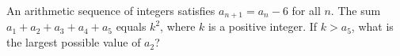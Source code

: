 An arithmetic sequence of integers satisfies $a_{n+1}=a_n-6$ for all $n$. The sum $a_1+a_2+a_3+a_4+a_5$ equals $k^2$, where $k$ is a positive integer. If $k>a_5$, what is the largest possible value of $a_2$?
